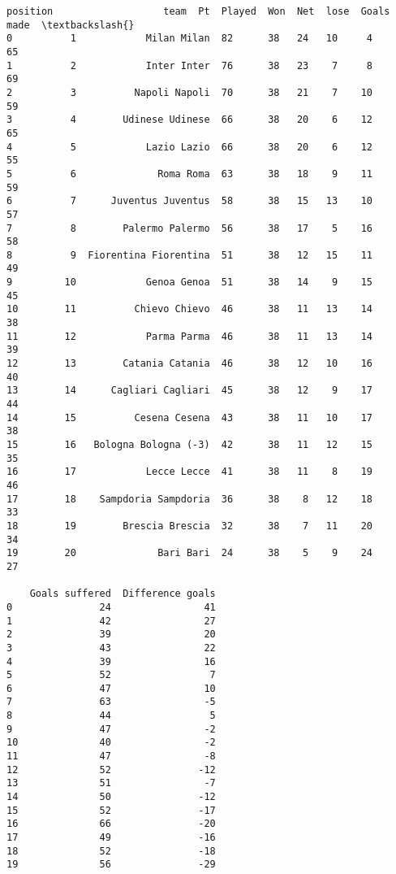 \documentclass[11pt]{article}
\makeatletter
\newcommand{\boxspacing}{\kern\kvtcb@left@rule\kern\kvtcb@boxsep}
\newcommand{\prompt}[4]{
        {\ttfamily\llap{{\color{#2}[#3]:\hspace{3pt}#4}}\vspace{-\baselineskip}}
    }
\makeatother
\begin{document}
            \begin{tcolorbox}[breakable, size=fbox, boxrule=.5pt, pad at break*=1mm, opacityfill=0]
\prompt{Out}{outcolor}{35}{\boxspacing}
\begin{Verbatim}[commandchars=\\\{\}]
    position                   team  Pt  Played  Won  Net  lose  Goals made  \textbackslash{}
0          1            Milan Milan  82      38   24   10     4          65
1          2            Inter Inter  76      38   23    7     8          69
2          3          Napoli Napoli  70      38   21    7    10          59
3          4        Udinese Udinese  66      38   20    6    12          65
4          5            Lazio Lazio  66      38   20    6    12          55
5          6              Roma Roma  63      38   18    9    11          59
6          7      Juventus Juventus  58      38   15   13    10          57
7          8        Palermo Palermo  56      38   17    5    16          58
8          9  Fiorentina Fiorentina  51      38   12   15    11          49
9         10            Genoa Genoa  51      38   14    9    15          45
10        11          Chievo Chievo  46      38   11   13    14          38
11        12            Parma Parma  46      38   11   13    14          39
12        13        Catania Catania  46      38   12   10    16          40
13        14      Cagliari Cagliari  45      38   12    9    17          44
14        15          Cesena Cesena  43      38   11   10    17          38
15        16   Bologna Bologna (-3)  42      38   11   12    15          35
16        17            Lecce Lecce  41      38   11    8    19          46
17        18    Sampdoria Sampdoria  36      38    8   12    18          33
18        19        Brescia Brescia  32      38    7   11    20          34
19        20              Bari Bari  24      38    5    9    24          27

    Goals suffered  Difference goals
0               24                41
1               42                27
2               39                20
3               43                22
4               39                16
5               52                 7
6               47                10
7               63                -5
8               44                 5
9               47                -2
10              40                -2
11              47                -8
12              52               -12
13              51                -7
14              50               -12
15              52               -17
16              66               -20
17              49               -16
18              52               -18
19              56               -29
\end{Verbatim}
\end{tcolorbox}
        
\end{document}
